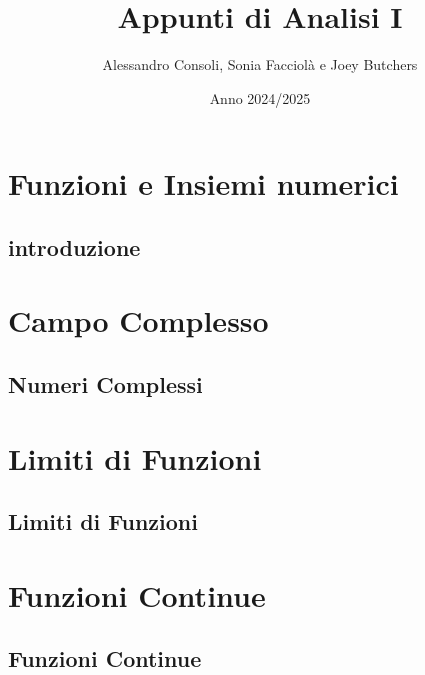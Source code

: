 \documentclass[a4paper,12pt]{report} %
\title{Appunti di Analisi I}
\author{Alessandro Consoli, Sonia Facciolà e Joey Butchers}
\date{Anno 2024/2025}
\begin{document}
    
    
    \tableofcontents


    \maketitle
    
\chapter{Funzioni e Insiemi numerici}

    \section{introduzione}

    

\chapter{Campo Complesso}

    \section{Numeri Complessi}

    


\chapter{Limiti di Funzioni}

    \section{Limiti di Funzioni}

    



\chapter{Funzioni Continue}

    \section{Funzioni Continue}
    
    
    
\end{document}
